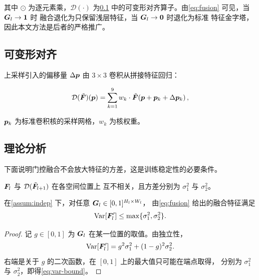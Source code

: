 其中 $\odot$ 为逐元素乘，$\mathcal{D}(\cdot)$ 为\cref{sec:method:align}
中的可变形对齐算子。由\cref{eq:fusion} 可见，当 $\bm{G}_l \to \mathbf{1}$ 时
融合退化为只保留浅层特征，当 $\bm{G}_l \to \mathbf{0}$ 时退化为标准
特征金字塔，因此本文方法是后者的严格推广。

\subsection{可变形对齐}
\label{sec:method:align}

上采样引入的偏移量 $\Delta \bm{p}$ 由 $3 \times 3$ 卷积从拼接特征回归：

\begin{equation}
  \label{eq:offset}
  \mathcal{D}(\tilde{\bm{F}})(\bm{p})
    = \sum_{k=1}^{9} w_k \cdot
      \tilde{\bm{F}}\!\left(\bm{p} + \bm{p}_k + \Delta \bm{p}_k\right),
\end{equation}

$\bm{p}_k$ 为标准卷积核的采样网格，$w_k$ 为核权重。

\subsection{理论分析}
\label{sec:method:theory}

下面说明门控融合不会放大特征的方差，这是训练稳定性的必要条件。

\begin{assumption}
  \label{assum:indep}
  $\bm{F}_l$ 与 $\mathcal{D}(\tilde{\bm{F}}_{l+1})$ 在各空间位置上
  互不相关，且方差分别为 $\sigma_1^2$ 与 $\sigma_2^2$。
\end{assumption}

\begin{theorem}[方差不增]
  \label{thm:variance}
  在\cref{assum:indep} 下，对任意 $\bm{G}_l \in [0,1]^{H_l \times W_l}$，
  由\cref{eq:fusion} 给出的融合特征满足
  \begin{equation}
    \label{eq:var-bound}
    \operatorname{Var}\!\left[\bm{F}_l'\right] \le \max\{\sigma_1^2, \sigma_2^2\}.
  \end{equation}
\end{theorem}

\begin{proof}
  记 $g \in [0,1]$ 为 $\bm{G}_l$ 在某一位置的取值。由独立性，
  \begin{equation}
    \label{eq:var-expand}
    \operatorname{Var}\!\left[\bm{F}_l'\right]
      = g^2 \sigma_1^2 + (1-g)^2 \sigma_2^2 .
  \end{equation}
  右端是关于 $g$ 的二次函数，在 $[0,1]$ 上的最大值只可能在端点取得，
  分别为 $\sigma_1^2$ 与 $\sigma_2^2$，即得\cref{eq:var-bound}。
\end{proof}

